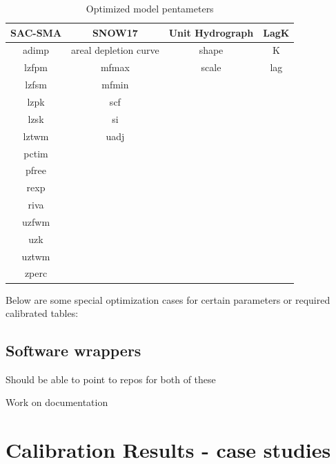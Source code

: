 \documentclass{agujournal2019}
\begin{document}
\begin{table}[ht]
    \centering
    \begin{tabular}{cccc}
    \hline
        SAC-SMA  & SNOW17                & Unit Hydrograph & LagK\\
    \hline
        adimp    & areal depletion curve & shape           & K   \\  
        lzfpm    & mfmax                 & scale           & lag \\  
        lzfsm    & mfmin                 &                 &     \\  
        lzpk     & scf                   &                 &     \\  
        lzsk     & si                    &                 &     \\  
        lztwm    & uadj                  &                 &     \\  
        pctim    &                       &                 &     \\  
        pfree    &                       &                 &     \\  
        rexp     &                       &                 &     \\  
        riva     &                       &                 &     \\  
        uzfwm    &                       &                 &     \\  
        uzk      &                       &                 &     \\  
        uztwm    &                       &                 &     \\  
        zperc    &                       &                 &     \\
    \hline
    \end{tabular}
    \caption{Optimized model pentameters}
    \label{tab:my_label}
\end{table}

Below are some special optimization cases for certain parameters or required calibrated tables:

\subsection{Software wrappers}

Should be able to point to repos for both of these

Work on documentation

\section{Calibration Results - case studies}
\end{document}
